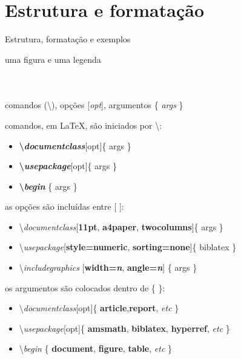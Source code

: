 \documentclass[aspectratio=169, 8pt]{beamer}
\begin{document}
\section{Estrutura e formatação}
\begin{frame}{Estrutura, formatação e exemplos}
\end{frame}

	\begin{frame}{uma figura e uma legenda}
		\begin{columns}
				\begin{figure}
					\centering
				\end{figure}
				\begin{figure}
					\centering	
				\end{figure}
		\end{columns}
	\end{frame}

	\begin{frame}[fragile]{comandos (\textbackslash), opções [\emph{opt}], argumentos \{ \emph{args} \}}
		
		\pause

		comandos, em \LaTeX, são iniciados por \textbackslash :
		\begin{itemize}
			\item \textbf{\textbackslash \emph{documentclass}}[opt]\{ args \}
			\item \textbf{\textbackslash \emph{usepackage}}[opt]\{ args \}
			\item \textbf{\textbackslash \emph{begin}} \{ args \}
		\end{itemize}
		\pause

		as opções são incluídas entre [ ]:
		\begin{itemize}
			\item \textbackslash \emph{documentclass}[\textbf{11pt}, \textbf{a4paper}, \textbf{twocolumns}]\{ args \}
			\item \textbackslash \emph{usepackage}[\textbf{style=numeric}, \textbf{sorting=none}]\{ biblatex \}
			\item \textbackslash \emph{includegraphics} [\textbf{width=\emph{n}}, \textbf{angle=\emph{n}}] \{ args \}
		\end{itemize}

		\pause
		os argumentos são colocados dentro de \{ \}:
		\begin{itemize}
			\item \textbackslash \emph{documentclass}[opt]\{ \textbf{article},\textbf{report}, \emph{etc} \}
			\item \textbackslash \emph{usepackage}[opt]\{ \textbf{amsmath}, \textbf{biblatex}, \textbf{hyperref}, \emph{etc} \}
			\item \textbackslash \emph{begin} \{ \textbf{document}, \textbf{figure}, \textbf{table}, \emph{etc} \}
		\end{itemize}



	\end{frame}
\end{document}
